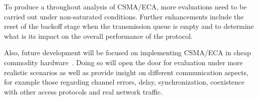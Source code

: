 

To produce a throughout analysis of CSMA/ECA, more evaluations need to be carried out under non-saturated conditions. Further enhancements include the reset of the backoff stage when the transmission queue is empty and to determine what is its impact on the overall performance of the protocol.


Also, future development will be focused on implementing CSMA/ECA in cheap commodity hardware~\cite{WMP}. Doing so will open the door for evaluation under more realistic scenarios as well as provide insight on different communication aspects, for example those regarding channel errors, delay, synchronization, coexistence with other access protocols and real network traffic. 

